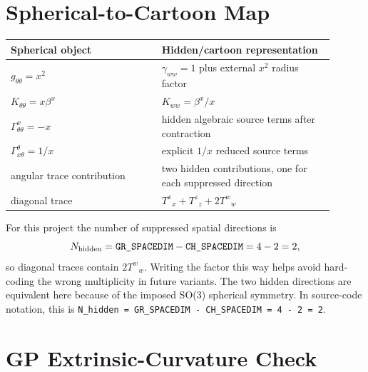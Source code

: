 \documentclass[11pt]{article}
\newcommand{\GRSP}{\texttt{GR\_SPACEDIM}}
\newcommand{\CHSP}{\texttt{CH\_SPACEDIM}}
\begin{document}
\section{Spherical-to-Cartoon Map}

\begin{center}
\begin{tabular}{>{\raggedright}p{0.42\linewidth}>{\raggedright\arraybackslash}p{0.48\linewidth}}
\hline
Spherical object & Hidden/cartoon representation \\
\hline
\(g_{\theta\theta}=x^2\) & \(\gamma_{ww}=1\) plus external \(x^2\) radius factor \\
\(K_{\theta\theta}=x\beta^x\) & \(K_{ww}=\beta^x/x\) \\
\(\Gamma^x_{\theta\theta}=-x\) & hidden algebraic source terms after contraction \\
\(\Gamma^\theta_{x\theta}=1/x\) & explicit \(1/x\) reduced source terms \\
angular trace contribution & two hidden contributions, one for each suppressed direction \\
diagonal trace & \(T^x{}_x + T^z{}_z + 2T^w{}_w\) \\
\hline
\end{tabular}
\end{center}

For this project the number of suppressed spatial directions is
\begin{equation}
  N_{\rm hidden}=\GRSP-\CHSP=4-2=2,
\end{equation}
so diagonal traces contain \(2T^w{}_w\). Writing the factor this way helps
avoid hard-coding the wrong multiplicity in future variants. The two hidden
directions are equivalent here because of the imposed SO(3) spherical symmetry.
In source-code notation, this is
\verb|N_hidden = GR_SPACEDIM - CH_SPACEDIM = 4 - 2 = 2|.

\section{GP Extrinsic-Curvature Check}
\end{document}
